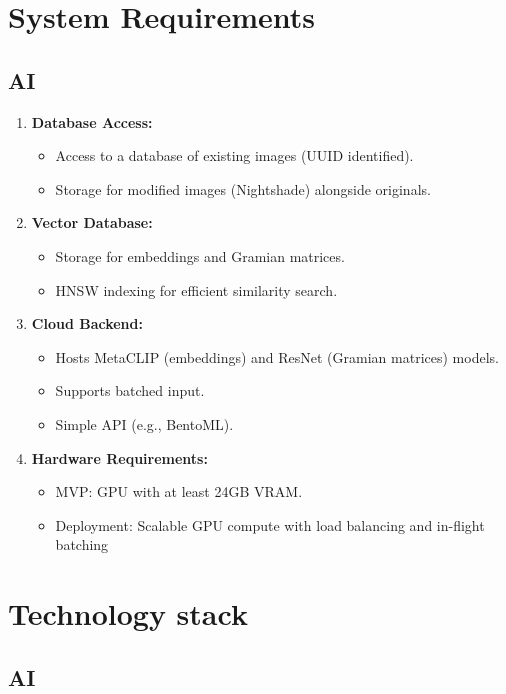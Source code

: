 \newpage

\chapter{System Requirements}
\section{AI}
\begin{enumerate}
\item \textbf{Database Access:}
    \begin{itemize}
    \item Access to a database of existing images (UUID identified).
    \item Storage for modified images (Nightshade) alongside originals.
    \end{itemize}
\item \textbf{Vector Database:}
    \begin{itemize}
    \item Storage for embeddings and Gramian matrices.
    \item HNSW indexing for efficient similarity search.
    \end{itemize}

\item \textbf{Cloud Backend:}
    \begin{itemize}
    \item Hosts MetaCLIP (embeddings) and ResNet (Gramian matrices) models.
    \item Supports batched input.
    \item Simple API (e.g., BentoML).
    \end{itemize}

\item \textbf{Hardware Requirements:}
    \begin{itemize}
    \item MVP: GPU with at least 24GB VRAM.
    \item Deployment: Scalable GPU compute with load balancing and in-flight batching
    \end{itemize}
\end{enumerate}

\newpage

\chapter{Technology stack}
\section{AI}

